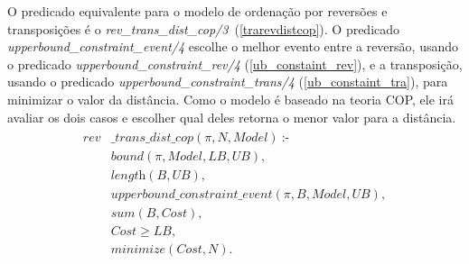O predicado equivalente para o modelo de ordenação por reversões e
transposições é o
\textit{rev\_trans\_dist\_cop/3}~(\ref{trarevdistcop}). O predicado
\textit{upperbound\_constraint\_event/4} escolhe o melhor evento entre a
reversão, usando o predicado \textit{upperbound\_constraint\_rev/4}
(\ref{ub_constaint_rev}), e a transposição, usando o predicado
\textit{upperbound\_constraint\_trans/4} (\ref{ub_constaint_tra}), para
minimizar o valor da distância. Como o modelo é baseado na teoria COP,
ele irá avaliar os dois casos e escolher qual deles retorna o menor
valor para a distância.
\begin{align}
  \label{trarevdistcop}
  \begin{split}
  \textit{rev}&\textit{\_trans\_dist\_cop}(\pi, N, Model)~\text{:-} \\
  &\textit{bound}(\pi, Model, LB, UB), \\
  &\textit{length}(B, UB),  \\
  &\textit{upperbound\_constraint\_event}(\pi, B, Model, UB), \\
  &\textit{sum}(B, Cost),  \\
  &\textit{Cost} \ge \textit{LB},  \\
  &\textit{minimize}(Cost, N). 
  \end{split}
\end{align}

